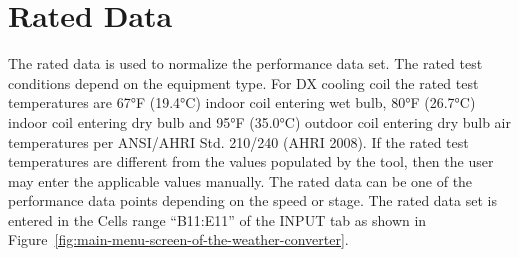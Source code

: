 \section{Rated Data}\label{rated-data}

The rated data is used to normalize the performance data set. The rated test conditions depend on the equipment type. For DX cooling coil the rated test temperatures are 67°F (19.4°C) indoor coil entering wet bulb, 80°F (26.7°C) indoor coil entering dry bulb and 95°F (35.0°C) outdoor coil entering dry bulb air temperatures per ANSI/AHRI Std. 210/240 (AHRI 2008). If the rated test temperatures are different from the values populated by the tool, then the user may enter the applicable values manually. The rated data can be one of the performance data points depending on the speed or stage. The rated data set is entered in the Cells range ``B11:E11'' of the INPUT tab as shown in Figure~\ref{fig:main-menu-screen-of-the-weather-converter}.
